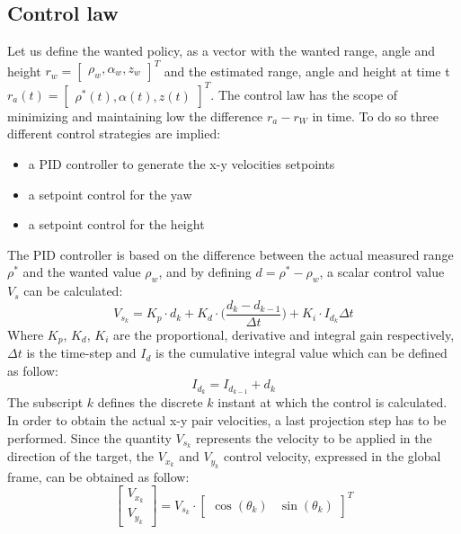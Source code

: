 \subsection{Control law}\label{control_law}
Let us define the wanted policy, as a vector with the wanted range, angle and height $r_w = \begin{bmatrix} \rho_w, \alpha_w, z_w \end{bmatrix}^T$ and the estimated range, angle and height at time t $r_a(t) = \begin{bmatrix} \rho^* (t) , \alpha(t), z(t) \end{bmatrix}^T$. The control law has the scope of minimizing and maintaining low the difference $r_a - r_W$ in time. To do so three different control strategies are implied:
\begin{itemize}
    \item a PID controller to generate the x-y velocities setpoints
    \item a setpoint control for the yaw
    \item a setpoint control for the height
\end{itemize}
The PID controller is based on the difference between the actual measured range $\rho^*$ and the wanted value $\rho_w$, and by defining $d = \rho^* - \rho_w$, a scalar control value $V_s$ can be calculated:
\begin{equation}
    V_{s_k} = K_p\cdot d_k + K_d\cdot\Big(\frac{d_k - d_{k-1}}{\Delta t}\Big) + K_i\cdot I_{d_k}\Delta t
\end{equation}
Where $K_p$, $K_d$, $K_i$ are the proportional, derivative and integral gain respectively, $\Delta t$ is the time-step and $I_d$ is the cumulative integral value which can be defined as follow:
\[
    I_{d_k} = I_{d_{k-1}} + d_k
\]
The subscript $k$ defines the discrete $k$ instant at which the control is calculated. In order to obtain the actual x-y pair velocities, a last projection step has to be performed. Since the quantity $V_{s_k}$ represents the velocity to be applied in the direction of the target, the $V_{x_k}$ and $V_{y_k}$ control velocity, expressed in the global frame, can be obtained as follow:
\begin{equation}\label{PF:VELxy}
    \begin{bmatrix} V_{x_k} \\ V_{y_k} \end{bmatrix} = V_{s_k} \cdot \begin{bmatrix} \cos (\theta_k) & \sin (\theta_k) \end{bmatrix}^T
\end{equation}
